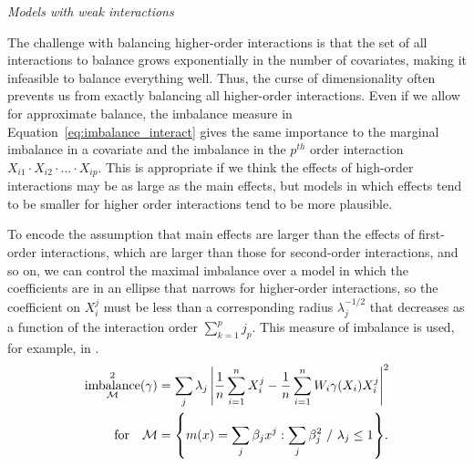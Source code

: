 \documentclass{article}
\newcommand{\subsubsection}[1]{\par\noindent\textit{#1}\enspace}
\DeclarePairedDelimiter\norm{\lVert}{\rVert}
\DeclarePairedDelimiter\set{\{}{\}}
\theoremstyle{definition}
\DeclareMathOperator{\imbalance}{imbalance}
\newcommand{\model}{\mathcal{M}}
\newcommand{\<}{\langle}
\renewcommand{\>}{\rangle}
\begin{document}
\subsubsection{Models with weak interactions}

The challenge with balancing higher-order interactions is that the set of all interactions to balance grows exponentially in the number of covariates, making it infeasible to balance everything well.
Thus, the curse of dimensionality often prevents us from exactly balancing all higher-order interactions.
Even if we allow for approximate balance,
the imbalance measure in Equation~\ref{eq:imbalance_interact} gives the same importance to the marginal imbalance in a covariate and the imbalance in the $p^{th}$ order interaction $X_{i1} \cdot X_{i2} \cdot ... \cdot X_{ip}$.
This is appropriate if we think the effects of high-order interactions may be as large as the main effects, but models in which effects tend to be smaller for higher order interactions tend to be more plausible.


To encode the assumption that main effects
are larger than the effects of first-order interactions, which are larger than those for second-order interactions, and so on, %
we can control the maximal imbalance over a model in which the coefficients are in an ellipse that narrows for higher-order interactions, so the coefficient on $X_i^j$ must be less than a corresponding radius $\lambda_j^{-1/2}$ that decreases as a function of the interaction order $\sum_{k=1}^p j_p$. This measure of imbalance is used, for example, in \citet[Equation 9]{benmichael2021_multical}.
\begin{equation}
    \label{eq:binary-rkhs}
\begin{aligned}
\imbalance^2_{\model}(\gamma) &= \sum_{j} \lambda_j \left|\frac{1}{n}\sum_{i=1}^n X_i^j - \frac{1}{n}\sum_{i=1}^nW_i \gamma(X_i) X_i^j\right|^2 \\
\quad \text{for} \quad \model &= \set*{m(x) = \sum_j \beta_{j} x^j : \sum_j \beta_j^2 \ /\ \lambda_j \le 1}.
\end{aligned}
\end{equation}

\end{document}
